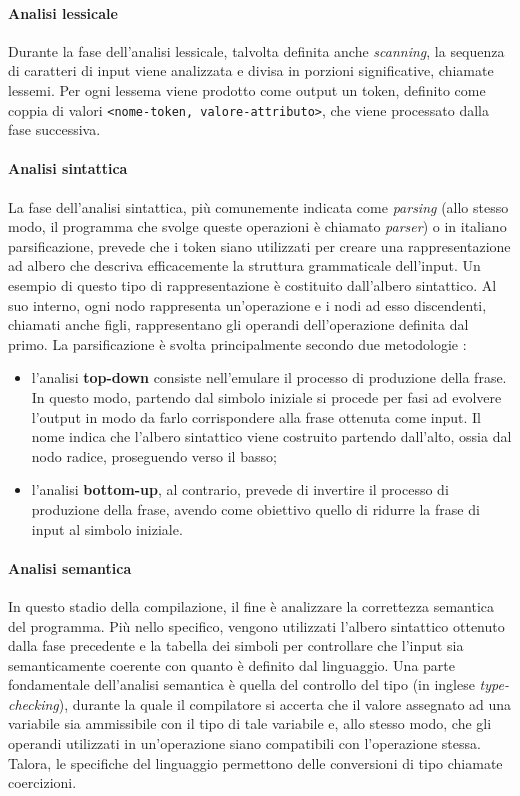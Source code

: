 \documentclass[12pt,a4paper,openright,twoside]{book}
\begin{document}
\paragraph{Analisi lessicale}
Durante la fase dell'analisi lessicale, talvolta definita anche \textit{scanning}, la sequenza di 
caratteri di input viene analizzata e divisa in porzioni significative, chiamate lessemi. Per ogni lessema viene prodotto come output un 
token, definito come coppia di valori \texttt{<nome-token, valore-attributo>}, che viene processato dalla fase successiva.

\paragraph{Analisi sintattica}
La fase dell'analisi sintattica, più comunemente indicata come \textit{parsing} (allo stesso modo, 
il programma che svolge queste operazioni è chiamato \textit{parser}) o in italiano parsificazione, prevede che i token siano 
utilizzati per creare una rappresentazione ad albero che descriva efficacemente la struttura grammaticale dell'input. Un esempio di 
questo tipo di rappresentazione è costituito dall'albero sintattico. Al suo interno, ogni nodo rappresenta un'operazione e i nodi ad 
esso discendenti, chiamati anche figli, rappresentano gli operandi dell'operazione definita dal primo. La parsificazione è svolta 
principalmente secondo due metodologie \cite{Grune2006}:

\begin{itemize}
    \item l’analisi \textbf{top-down} consiste nell'emulare il processo di produzione della frase. In questo modo, partendo dal simbolo 
    iniziale si procede per fasi ad evolvere l'output in modo da farlo corrispondere alla frase ottenuta come input. Il nome indica che 
    l'albero sintattico viene costruito partendo dall'alto, ossia dal nodo radice, proseguendo verso il basso;
    \item l’analisi \textbf{bottom-up}, al contrario, prevede di invertire il processo di produzione della frase, avendo come obiettivo 
    quello di ridurre la frase di input al simbolo iniziale.
\end{itemize}

\paragraph{Analisi semantica}
In questo stadio della compilazione, il fine è analizzare la correttezza semantica del programma. Più 
nello specifico, vengono utilizzati l'albero sintattico ottenuto dalla fase precedente e la tabella dei simboli per controllare che 
l'input sia semanticamente coerente con quanto è definito dal linguaggio. Una parte fondamentale dell'analisi semantica è quella del 
controllo del tipo (in inglese \textit{type-checking}), durante la quale il compilatore si accerta che il valore assegnato ad una 
variabile sia ammissibile con il tipo di tale variabile e, allo stesso modo, che gli operandi utilizzati in un’operazione siano 
compatibili con l’operazione stessa. Talora, le specifiche del linguaggio permettono delle conversioni di tipo chiamate coercizioni.
\end{document}
